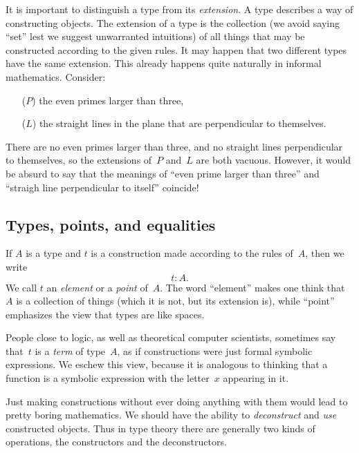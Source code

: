 \documentclass{amsart}
\begin{document}
It is important to distinguish a type from its \emph{extension}. A type
describes a way of constructing objects. The extension of a type is the
collection (we avoid saying ``set'' lest we suggest unwarranted intuitions) of
all things that may be constructed according to the given rules. It may happen
that two different types have the same extension. This already happens quite
naturally in informal mathematics. Consider:
%
\begin{enumerate}
\item[($P$)] the even primes larger than three,
\item[($L$)] the straight lines in the plane that are perpendicular to themselves.
\end{enumerate}
%
There are no even primes larger than three, and no straight lines perpendicular
to themselves, so the extensions of~$P$ and~$L$ are both vacuous. However, it
would be absurd to say that the meanings of ``even prime larger than three'' and
``straigh line perpendicular to itself'' coincide!

\subsection{Types, points, and equalities}
\label{sec:types-points-equal}

If $A$ is a type and $t$ is a construction made according to the rules of~$A$,
then we write
%
\begin{equation*}
  t : A.
\end{equation*}
%
We call $t$ an \emph{element} or a \emph{point} of~$A$. The word ``element''
makes one think that~$A$ is a collection of things (which it is not, but its
extension is), while ``point'' emphasizes the view that types are like spaces.

People close to logic, as well as theoretical computer scientists, sometimes say
that~$t$ is a \emph{term} of type~$A$, as if constructions were just formal
symbolic expressions. We eschew this view, because it is analogous to thinking
that a function is a symbolic expression with the letter~$x$ appearing in it.

Just making constructions without ever doing anything with them would lead to
pretty boring mathematics. We should have the ability to \emph{deconstruct} and
\emph{use} constructed objects. Thus in type theory there are generally two
kinds of operations, the constructors and the deconstructors.
\end{document}
